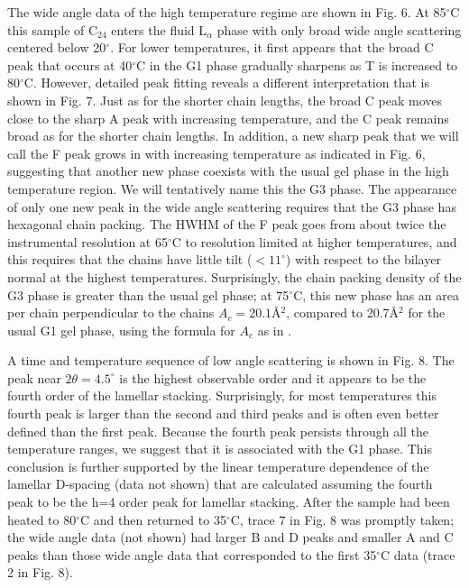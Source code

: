 The wide angle data of the high temperature regime are shown in Fig. 6.  
At 85$^{\circ}$C this sample of C$_{24}$ enters the fluid L$_\alpha$ phase 
with only broad wide angle scattering centered below 20$^{\circ}$.  For lower
temperatures, it first appears that the broad C peak that occurs at 
40$^{\circ}$C in the G1 phase gradually sharpens as T is increased to 
80$^{\circ}$C.  However, detailed peak fitting reveals a different 
interpretation 
that is shown in Fig. 7.  Just as for the shorter chain lengths, the broad C
peak moves close to the sharp A peak with increasing temperature,
and the C peak remains broad as for the shorter chain lengths.
In addition, a new sharp peak that we will call the F peak grows in 
with increasing temperature as indicated in Fig. 6, suggesting that another 
new phase coexists with the usual gel phase in the high temperature region.  
We will tentatively name this
the G3 phase.  The appearance of only one new peak in 
the wide angle scattering requires that the G3 phase has 
hexagonal chain packing.  The HWHM of the F peak goes from about twice
the instrumental resolution at 65$^{\circ}$C to resolution limited at
higher temperatures, and this requires that the chains have little tilt 
($< 11^{\circ}$) with respect to the bilayer normal at the highest temperatures.
Surprisingly, the chain packing density of the G3
phase is greater than the usual gel phase; at 75$^{\circ}$C,
this new phase has an area per chain perpendicular to the chains 
$A_c = 20.1$\AA$^2$, compared to 20.7\AA$^2$ for the usual G1 gel phase,
using the formula for $A_c$ as in \cite{STN92,Sun94}.

A time and temperature sequence of low angle scattering is shown in Fig. 8.
The peak near $2 \theta = 4.5^{\circ}$ is the highest observable order and
it appears to be the fourth order of the lamellar stacking.
Surprisingly, for most temperatures this fourth peak is larger
than the second and third peaks and is often even better defined 
than the first peak.  Because the fourth peak persists through all the
temperature ranges, we suggest that it is associated with the G1 phase.
This conclusion is further supported by the linear temperature dependence
of the lamellar D-spacing (data not shown) that are calculated assuming the
fourth peak to be the h=4 order peak for lamellar stacking.
After the sample had been heated to 80$^{\circ}$C and then returned to 
35$^{\circ}$C, trace 7 in Fig. 8 was promptly taken;
the wide angle data (not shown) had larger B and D peaks and smaller A and C 
peaks than those wide angle data that corresponded to the first 
35$^{\circ}$C data (trace 2 in Fig. 8).

